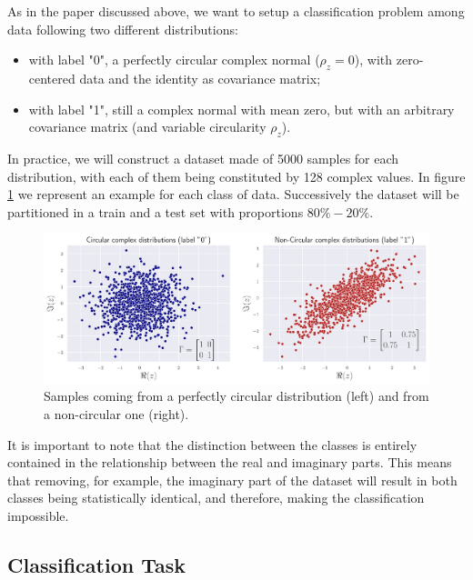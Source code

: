\documentclass[../main.tex]{subfiles}
\begin{document}
As in the paper discussed above, we want to setup a classification problem among data following two different distributions:
\begin{itemize}
	\item with label "0", a perfectly circular complex normal ($\rho_z=0$), with zero-centered data and the identity as covariance matrix;
	\item with label "1", still a complex normal with mean zero, but with an arbitrary covariance matrix (and variable circularity $\rho_z$).
\end{itemize}
In practice, we will construct a dataset made of 5000 samples for each distribution, with each of them being constituted by 128 complex values. In figure \ref{fig:circ_class_example} we represent an example for each class of data. Successively the dataset will be partitioned in a train and a test set with proportions $80\%-20\%$.\\
\begin{figure}[!ht]
	\centering
	\includegraphics[width=\textwidth]{pictures/circ_class_example}
	\caption{Samples coming from a perfectly circular distribution (left) and from a non-circular one (right).}
	\label{fig:circ_class_example}
\end{figure}
It is important to note that the distinction between the classes is entirely contained in the relationship between the real and imaginary parts. This means that removing, for example, the imaginary part of the dataset will result in both classes being statistically identical, and therefore, making the classification impossible.

\subsection*{Classification Task}
\end{document}
